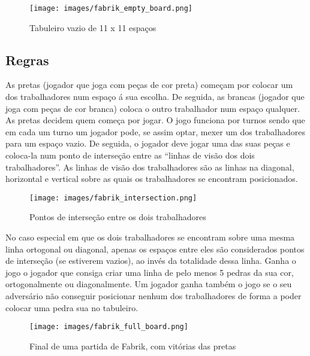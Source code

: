 \documentclass[a4paper]{article}
\begin{document}
\begin{figure}[h!]
\begin{center}
\texttt{[image: images/fabrik\_empty\_board.png]}
\caption{Tabuleiro vazio de 11 x 11 espaços}
\label{Figura 1}
\end{center}
\end{figure}

\subsection{Regras}
As pretas (jogador que joga com peças de cor preta) começam por colocar um dos trabalhadores num espaço á sua escolha. De seguida, as brancas (jogador que joga com peças de cor branca) coloca o outro trabalhador num espaço qualquer. As pretas decidem quem começa por jogar.
O jogo funciona por turnos sendo que em cada um turno um jogador pode, se assim optar, mexer um dos trabalhadores para um espaço vazio. De seguida, o jogador deve jogar uma das suas  peças e coloca-la num ponto de interseção entre as “linhas de visão dos dois trabalhadores”. As linhas de visão dos trabalhadores são as linhas na diagonal, horizontal e vertical sobre as quais os trabalhadores se encontram posicionados.

\begin{figure}[h!]
\begin{center}
\texttt{[image: images/fabrik\_intersection.png]}
\caption{Pontos de interseção entre os dois trabalhadores}
\label{Figura 2}
\end{center}
\end{figure}

No caso especial em que os dois trabalhadores se encontram sobre uma mesma linha ortogonal ou diagonal, apenas os espaços entre eles são considerados pontos de interseção (se estiverem vazios), ao invés da totalidade dessa linha.
Ganha o jogo o jogador que consiga criar uma linha de pelo menos 5 pedras da sua cor, ortogonalmente ou diagonalmente. Um jogador ganha também o jogo se o seu adversário não conseguir posicionar nenhum dos trabalhadores de forma a poder colocar uma pedra sua no tabuleiro.

\begin{figure}[h!]
\begin{center}
\texttt{[image: images/fabrik\_full\_board.png]}
\caption{Final de uma partida de Fabrik, com vitórias das pretas}
\label{Figura 3}
\end{center}
\end{figure}
\end{document}
